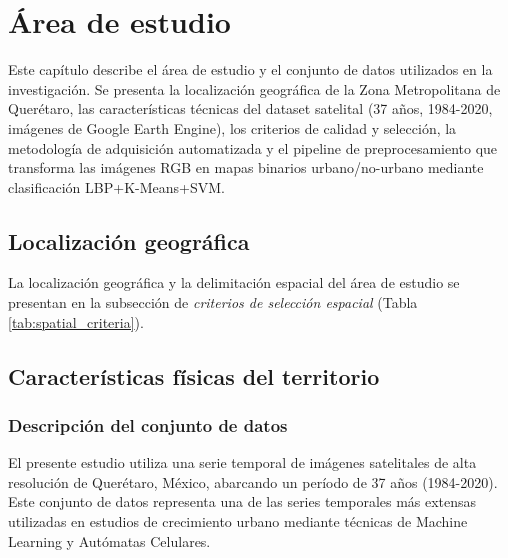 
\chapter{Área de estudio}
\label{ch:area-estudio}

\begin{resumen}
Este capítulo describe el área de estudio y el conjunto de datos utilizados en la investigación. Se presenta la localización geográfica de la Zona Metropolitana de Querétaro, las características técnicas del dataset satelital (37 años, 1984-2020, imágenes de Google Earth Engine), los criterios de calidad y selección, la metodología de adquisición automatizada y el pipeline de preprocesamiento que transforma las imágenes RGB en mapas binarios urbano/no-urbano mediante clasificación LBP+K-Means+SVM.
\end{resumen}

\section{Localización geográfica}


La localización geográfica y la delimitación espacial del área de estudio se presentan en la subsección de \textit{criterios de selección espacial} (Tabla \ref{tab:spatial_criteria}).


\section{Características físicas del territorio}


\subsection{Descripción del conjunto de datos}

El presente estudio utiliza una serie temporal de imágenes satelitales de alta resolución de Querétaro, México, abarcando un período de 37 años (1984-2020). Este conjunto de datos representa una de las series temporales más extensas utilizadas en estudios de crecimiento urbano mediante técnicas de Machine Learning y Autómatas Celulares.

